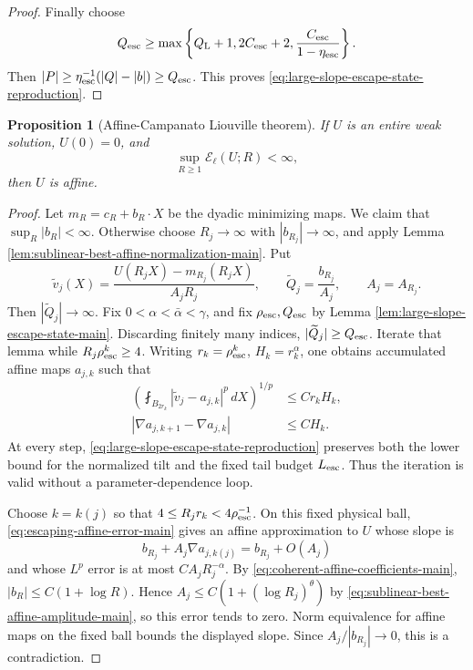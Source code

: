 \documentclass[11pt,reqno]{amsart}
\numberwithin{equation}{section}
\newcommand{\dd}{\,d}
\newtheorem{proposition}[theorem]{Proposition}
\theoremstyle{remark}
\begin{document}
\begin{proof}
Finally choose
\[
 Q_{\rm esc}\ge
 \max\left\{Q_{\rm L}+1,
 2C_{\rm esc}+2,
 \frac{C_{\rm esc}}{1-\eta_{\rm esc}}\right\}.
\]
Then
\(|P|\ge\eta_{\rm esc}^{-1}(|Q|-|b|)\ge Q_{\rm esc}\).
This proves \eqref{eq:large-slope-escape-state-reproduction}.
\end{proof}

\begin{proposition}[Affine-Campanato Liouville theorem]
\label{prop:affine-campanato-liouville-main}
If \(U\) is an entire weak solution, \(U(0)=0\), and
\begin{equation*}
 \sup_{R\ge1}\mathscr E_\ell(U;R)<\infty,
\end{equation*}
then \(U\) is affine.
\end{proposition}

\begin{proof}
Let \(m_R=c_R+b_R\cdot X\) be the dyadic minimizing maps.  We claim
that \(\sup_R|b_R|<\infty\).  Otherwise choose \(R_j\to\infty\) with
\(|b_{R_j}|\to\infty\), and apply Lemma
\ref{lem:sublinear-best-affine-normalization-main}.  Put
\[
 \widetilde v_j(X)=
 \frac{U(R_jX)-m_{R_j}(R_jX)}{A_jR_j},
 \qquad \widetilde Q_j=\frac{b_{R_j}}{A_j},
 \qquad A_j=A_{R_j}.
\]
Then \(|\widetilde Q_j|\to\infty\).  Fix
\(0<\alpha<\bar\alpha<\gamma\), and fix
\(\rho_{\rm esc},Q_{\rm esc}\) by Lemma
\ref{lem:large-slope-escape-state-main}.  Discarding finitely many
indices, \(|\widetilde Q_j|\ge Q_{\rm esc}\).  Iterate that lemma while
\(R_j\rho_{\rm esc}^k\ge4\).  Writing
\(r_k=\rho_{\rm esc}^k\), \(H_k=r_k^\alpha\), one obtains accumulated
affine maps \(a_{j,k}\) such that
\begin{align}
 \left(\fint_{B_{2r_k}}|\widetilde v_j-a_{j,k}|^p\dd X\right)^{1/p}
 &\le Cr_kH_k,
 \label{eq:escaping-affine-error-main}\\
 |\nabla a_{j,k+1}-\nabla a_{j,k}|&\le CH_k.
 \label{eq:escaping-affine-increments-main}
\end{align}
At every step, \eqref{eq:large-slope-escape-state-reproduction}
preserves both the lower bound for the normalized tilt and the fixed
tail budget \(L_{\rm esc}\).  Thus the iteration is valid without a
parameter-dependence loop.

Choose \(k=k(j)\) so that
\(4\le R_jr_k<4\rho_{\rm esc}^{-1}\).  On this fixed physical ball,
\eqref{eq:escaping-affine-error-main} gives an affine approximation to
\(U\) whose slope is
\[
 b_{R_j}+A_j\nabla a_{j,k(j)}=b_{R_j}+O(A_j)
\]
and whose \(L^p\) error is at most \(CA_jR_j^{-\alpha}\).  By
\eqref{eq:coherent-affine-coefficients-main},
\(|b_R|\le C(1+\log R)\).  Hence
\(A_j\le C(1+(\log R_j)^\theta)\) by
\eqref{eq:sublinear-best-affine-amplitude-main}, so this error tends to
zero.  Norm
equivalence for affine maps on the fixed ball bounds the displayed
slope.  Since \(A_j/|b_{R_j}|\to0\), this is a contradiction.


\end{proof}
\end{document}
